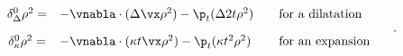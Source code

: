 \begin{equation}
     \begin{array}{ccc}
	\delta^0_{\Delta}\rho^{2}=
&-\vnabla\cdot(\Delta\vx\rho^2)-\p_{t}(\Delta 2t\rho^2)\quad\hfill
&\hbox{for a dilatation}\ \hfill
\\[10pt]
\delta^0_{\kappa}\rho^{2}=
&-\vnabla\cdot(\kappa t\vx\rho^2)-\p_{t}(\kappa t^2\rho^2)\hfill
&\hbox{for an expansion}\ \hfill
\end{array}\quad.
\label{confondens}
\end{equation}

